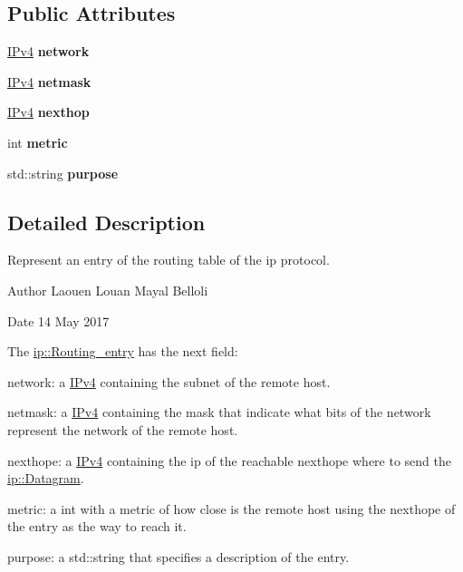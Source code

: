 \subsection*{Public Attributes}
\begin{DoxyCompactItemize}
\item 
\hyperlink{structIPv4}{I\+Pv4} {\bfseries network}\hypertarget{structip_1_1Routing__entry_a71f05d75bccb8d9c22279d7dd85ae8d4}{}\label{structip_1_1Routing__entry_a71f05d75bccb8d9c22279d7dd85ae8d4}

\item 
\hyperlink{structIPv4}{I\+Pv4} {\bfseries netmask}\hypertarget{structip_1_1Routing__entry_ada2fd8977a73fe53ba46e33d27ff2aa6}{}\label{structip_1_1Routing__entry_ada2fd8977a73fe53ba46e33d27ff2aa6}

\item 
\hyperlink{structIPv4}{I\+Pv4} {\bfseries nexthop}\hypertarget{structip_1_1Routing__entry_a0cc799eaa340a36f5ee85b0ae481a89d}{}\label{structip_1_1Routing__entry_a0cc799eaa340a36f5ee85b0ae481a89d}

\item 
int {\bfseries metric}\hypertarget{structip_1_1Routing__entry_ae1716d85035bef832f0efb163834a654}{}\label{structip_1_1Routing__entry_ae1716d85035bef832f0efb163834a654}

\item 
std\+::string {\bfseries purpose}\hypertarget{structip_1_1Routing__entry_a2ab5f00c9e3a4b2a707e236a82f9a2ce}{}\label{structip_1_1Routing__entry_a2ab5f00c9e3a4b2a707e236a82f9a2ce}

\end{DoxyCompactItemize}


\subsection{Detailed Description}
Represent an entry of the routing table of the ip protocol. 

\begin{DoxyAuthor}{Author}
Laouen Louan Mayal Belloli 
\end{DoxyAuthor}
\begin{DoxyDate}{Date}
14 May 2017
\end{DoxyDate}
The \hyperlink{structip_1_1Routing__entry}{ip\+::\+Routing\+\_\+entry} has the next field\+:
\begin{DoxyEnumerate}
\item network\+: a \hyperlink{structIPv4}{I\+Pv4} containing the subnet of the remote host.
\item netmask\+: a \hyperlink{structIPv4}{I\+Pv4} containing the mask that indicate what bits of the network represent the network of the remote host.
\item nexthope\+: a \hyperlink{structIPv4}{I\+Pv4} containing the ip of the reachable nexthope where to send the \hyperlink{structip_1_1Datagram}{ip\+::\+Datagram}.
\item metric\+: a int with a metric of how close is the remote host using the nexthope of the entry as the way to reach it.
\item purpose\+: a std\+::string that specifies a description of the entry. 
\end{DoxyEnumerate}

